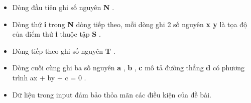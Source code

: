 \begin{itemize}
	\item     Dòng đầu tiên ghi số nguyên    \textbf{     N    }    .   
	\item     Dòng thứ    \textbf{     i    }    trong    \textbf{     N    }    dòng tiếp theo, mỗi dòng ghi 2 số nguyên    \textbf{     x y    }    là tọa độ của điểm thứ    \textbf{     i    }    thuộc tập    \textbf{     S    }    .   
	\item     Dòng tiếp theo ghi số nguyên    \textbf{     T    }    .   
	\item     Dòng cuối cùng ghi ba số nguyên    \textbf{     a    }    ,    \textbf{     b    }    ,    \textbf{     c    }    mô tả đường thẳng    \textbf{     d    }    có phương trình    ax + by + c = 0    .   
	\item     Dữ liệu trong input đảm bảo thỏa mãn các điều kiện của đề bài.   
\end{itemize}